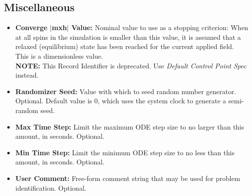 \subsection{Miscellaneous}\label{sec:mifmisc}
\begin{itemize}
   \item {\bf\boldmath Converge $|$mxh$|$ Value:}
      Nominal value to use as a stopping criterion: When
      {}
      {}
      at all spins in the simulation is smaller than this value, it is
      assumed that a relaxed (equilibrium) state has been reached for
      the current applied field.  This is a dimensionless value.\\
      {\bf NOTE:} This Record Identifier is deprecated.  Use {\em
      Default Control Point Spec} instead.
  \item {\bf Randomizer Seed:} Value with which to seed random
      number generator.  Optional.  Default value
      is 0, which uses the system clock to generate a semi-random seed.
  \item {\bf Max Time Step:} Limit the maximum ODE step
      size to no larger than this amount, in
      seconds.  Optional.
  \item {\bf Min Time Step:} Limit the minimum ODE step size to no
      less than this amount, in seconds.  Optional.
  \item {\bf User Comment:} Free-form comment string that may be used
      for problem identification.  Optional.
\end{itemize}

